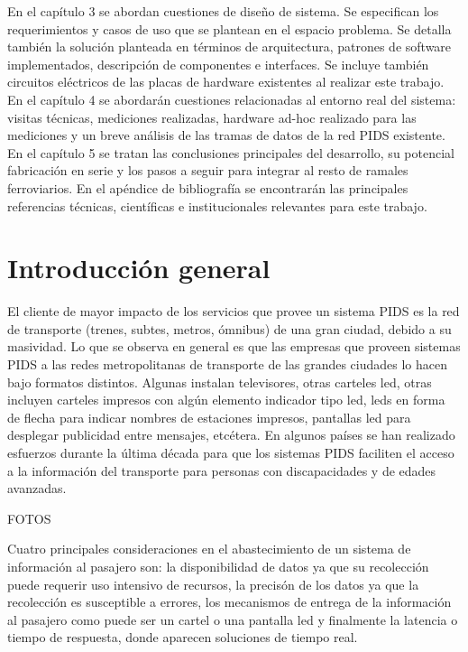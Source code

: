 En el capítulo 3 se abordan cuestiones de diseño de sistema. Se especifican los requerimientos y casos de uso que se plantean en el espacio problema. Se detalla también la solución planteada en términos de arquitectura, patrones de software implementados, descripción de componentes e interfaces. Se incluye también circuitos eléctricos de las placas de hardware existentes al realizar este trabajo.\\

En el capítulo 4 se abordarán cuestiones relacionadas al entorno real del sistema: visitas técnicas, mediciones realizadas, hardware ad-hoc realizado para las mediciones y un breve análisis de las tramas de datos de la red PIDS existente.\\

En el capítulo 5 se tratan las conclusiones principales del desarrollo, su potencial fabricación en serie y los pasos a seguir para integrar al resto de ramales ferroviarios. En el apéndice de bibliografía se encontrarán las principales referencias técnicas, científicas e institucionales relevantes para este trabajo.\\


\pagebreak
\section{Introducción general}

El cliente de mayor impacto de los servicios que provee un sistema PIDS es la red de transporte (trenes, subtes, metros, ómnibus) de una gran ciudad, debido a su masividad. Lo que se observa en general es que las empresas que proveen sistemas PIDS a las redes metropolitanas de transporte de las grandes ciudades lo hacen bajo formatos distintos. Algunas instalan televisores, otras carteles led, otras incluyen carteles impresos con algún elemento indicador tipo led, leds en forma de flecha para indicar nombres de estaciones impresos, pantallas led para desplegar publicidad entre mensajes, etcétera. En algunos países se han realizado esfuerzos durante la última década para que los sistemas PIDS faciliten el acceso a la información del transporte para personas con discapacidades y de edades avanzadas.


FOTOS

Cuatro principales consideraciones en el abastecimiento de un sistema de información al pasajero son: la disponibilidad de datos ya que su recolección puede requerir uso intensivo de recursos, la precisón de los datos ya que la recolección es susceptible a errores, los mecanismos de entrega de la información al pasajero como puede ser un cartel o una pantalla led y finalmente la latencia o tiempo de respuesta, donde aparecen soluciones de tiempo real.

